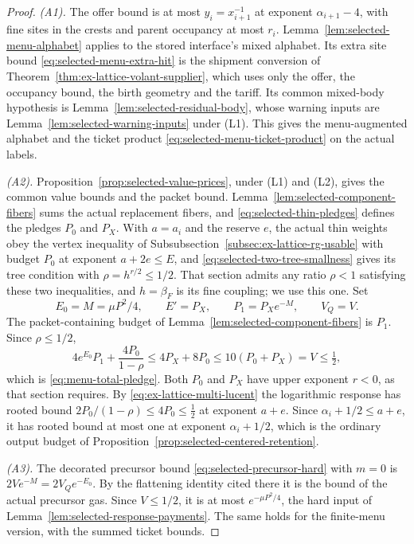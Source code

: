 \begin{proof}
\emph{(A1).} The offer bound is at most $y_i=x_{i+1}^{-1}$ at exponent
$\alpha_{i+1}-4$, with fine sites in the crests and parent occupancy at
most $r_i$. Lemma~\ref{lem:selected-menu-alphabet} applies to the stored
interface's mixed alphabet. Its extra site bound
\eqref{eq:selected-menu-extra-hit} is the shipment conversion of
Theorem~\ref{thm:ex-lattice-volant-supplier}, which uses only the
offer, the occupancy bound, the birth geometry and the tariff. Its
common mixed-body hypothesis is Lemma~\ref{lem:selected-residual-body},
whose warning inputs are Lemma~\ref{lem:selected-warning-inputs}
under (L1). This gives the menu-augmented alphabet and the ticket
product \eqref{eq:selected-menu-ticket-product} on the actual labels.

\emph{(A2).} Proposition~\ref{prop:selected-value-prices}, under (L1)
and (L2), gives the common value bounds and the packet bound.
Lemma~\ref{lem:selected-component-fibers} sums the actual replacement
fibers, and \eqref{eq:selected-thin-pledges} defines the pledges
$P_0$ and $P_X$. With $a=a_i$ and the reserve $e$, the actual thin
weights obey the vertex inequality of
Subsubsection~\ref{subsec:ex-lattice-rg-usable} with budget $P_0$ at exponent
$a+2e\le E$, and \eqref{eq:selected-two-tree-smallness} gives its tree
condition with $\rho=h^{r/2}\le1/2$. That section admits any ratio
$\rho<1$ satisfying these two inequalities, and $h=\beta_F$ is its
fine coupling; we use this one.
Set
\[
 E_0=M=\mu P^2/4,\qquad E'=P_X,\qquad P_1=P_Xe^{-M},\qquad V_Q=V.
\]
The packet-containing budget of Lemma~\ref{lem:selected-component-fibers}
is $P_1$. Since $\rho\le1/2$,
\[
 4e^{E_0}P_1+\frac{4P_0}{1-\rho}\le4P_X+8P_0\le10(P_0+P_X)=V\le\tfrac12,
\]
which is \eqref{eq:menu-total-pledge}. Both $P_0$ and $P_X$ have upper
exponent $r<0$, as that section requires. By
\eqref{eq:ex-lattice-multi-lucent} the logarithmic response has rooted
bound $2P_0/(1-\rho)\le4P_0\le\tfrac12$ at exponent $a+e$. Since
$\alpha_i+1/2\le a+e$, it has rooted bound at most one at exponent
$\alpha_i+1/2$, which is the ordinary output budget of
Proposition~\ref{prop:selected-centered-retention}.

\emph{(A3).} The decorated precursor bound
\eqref{eq:selected-precursor-hard} with $m=0$ is $2Ve^{-M}=2V_Qe^{-E_0}$.
By the flattening identity cited there it is the bound of the actual
precursor gas. Since $V\le1/2$, it is at most $e^{-\mu P^2/4}$, the hard
input of Lemma~\ref{lem:selected-response-payments}. The same holds for
the finite-menu version, with the summed ticket bounds.


\end{proof}
